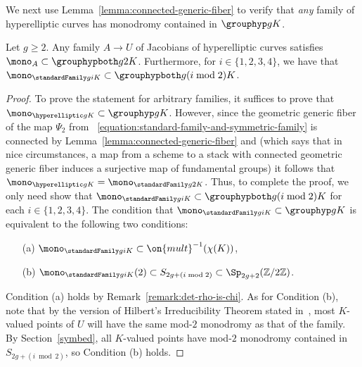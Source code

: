 We next use Lemma~\eqref{lemma:connected-generic-fiber} to verify that \emph{any} family of hyperelliptic curves has monodromy contained in $\grouphyp g K$.

\begin{lemma}
	\label{lemma:monodromy-containment}
	Let $g \geq 2$. Any family $A \rightarrow U$ of Jacobians of hyperelliptic curves satisfies
$\mono_{A} \subset \grouphypboth g {2} K$.
Furthermore, for $i \in \{1, 2, 3, 4\}$, we have that
$\mono_{\standardFamily g i K} \subset \grouphypboth g {(i \bmod 2)} K$.
\end{lemma}
\begin{proof}
	To prove the statement for arbitrary
	families, it suffices to prove that
	$\mono_{\hyperelliptic g K} \subset \grouphyp g K$.
	However, since the geometric generic fiber of the map $\Psi_2$ from 
	~\eqref{equation:standard-family-and-symmetric-family} is connected by Lemma~\ref{lemma:connected-generic-fiber} and
	\cite[Proposition 5.2]{landesman-swaminathan-tao-xu:rational-families} (which says that in nice circumstances, a map from a scheme
	to a stack with connected geometric generic fiber induces 
	a surjective map of fundamental groups)
	it follows
	that $\mono_{\hyperelliptic g K} = \mono_{\standardFamily g 2 K}$. Thus, to complete the proof, we only need show that
$\mono_{\standardFamily g i K} \subset \grouphypboth g {(i \bmod 2)} K$ for each $i \in \{1, 2, 3, 4\}$.
	The condition that $\mono_{\standardFamily g i K} \subset \grouphyp g K$ is equivalent to the following
	two conditions: 
    \begin{enumerate}
    \item[(a)] $\mono_{\standardFamily g i K} \subset \on{mult}^{-1}(\chi(K))$,
	\item[(b)] $\mono_{\standardFamily g i K}(2) \subset S_{2g+(i \bmod 2)} \subset \Sp_{2g+2}(\mathbb Z/2\mathbb Z)$.
    \end{enumerate}
	Condition (a) holds by Remark~\ref{remark:det-rho-is-chi}.
	As for Condition (b), note that by the version of Hilbert's Irreducibility Theorem  stated in~\cite[Theorem 1.2]{zywina2010hilbert}, most $K$-valued points of $U$ will have the same mod-$2$ monodromy
	as that of the family. By Section~\ref{symbed}, all $K$-valued points have mod-$2$ monodromy contained in $S_{2g+(i \bmod 2)}$, so Condition (b) holds.
\end{proof}

